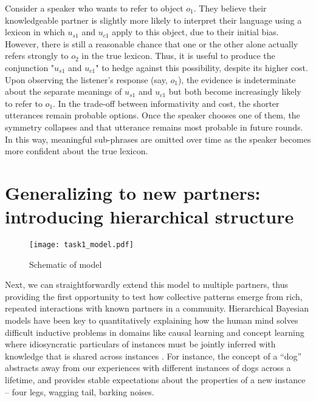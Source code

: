 Consider a speaker who wants to refer to object $o_1$. They believe their knowledgeable partner is slightly more likely to interpret their language using a lexicon in which $u_{s1}$ and $u_{c1}$ apply to this object, due to their initial bias. However, there is still a reasonable chance that one or the other alone actually refers strongly to $o_2$ in the true lexicon. Thus, it is useful to produce the conjunction "$u_{s1}$ and $u_{c1}$" to hedge against this possibility, despite its higher cost. Upon observing the listener's response (say, $o_1$), the evidence is indeterminate about the separate meanings of $u_{s1}$ and $u_{c1}$ but both become increasingly likely to refer to $o_1$. In the trade-off between informativity and cost, the shorter utterances remain probable options. Once the speaker chooses one of them, the symmetry collapses and that utterance remains most probable in future rounds. In this way, meaningful sub-phrases are omitted over time as the speaker becomes more confident about the true lexicon. 

\section{Generalizing to new partners: introducing hierarchical structure}

\begin{figure}
\centering
    \texttt{[image: task1\_model.pdf]}
  \caption{Schematic of model}
  \label{fig:task1model}
\end{figure}

Next, we can straightforwardly extend this model to multiple partners, thus providing the first opportunity to test how collective patterns emerge from rich, repeated interactions with known partners in a community. 
Hierarchical Bayesian models have been key to quantitatively explaining how the human mind solves difficult inductive problems in domains like causal learning and concept learning where idiosyncratic particulars of instances must be jointly inferred with knowledge that is shared across instances .
For instance, the concept of a ``dog'' abstracts away from our experiences with different instances of dogs across a lifetime, and provides stable expectations about the properties of a new instance -- four legs, wagging tail, barking noises.

